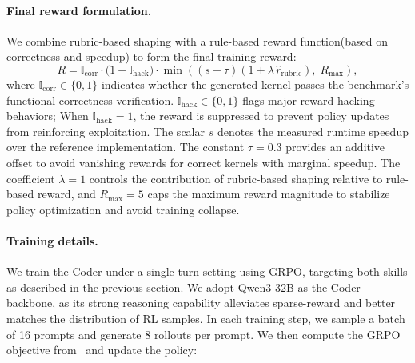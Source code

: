 \paragraph{Final reward formulation.}
We combine rubric-based shaping with a rule-based reward function(based on correctness and speedup) to form the final training reward:
{\footnotesize
\begin{equation}
R
=
\mathbb{I}_{\mathrm{corr}}
\cdot
\bigl(1-\mathbb{I}_{\mathrm{hack}}\bigr)
\cdot
\min\!\left(
\left(s + \tau \right)
\left( 1 + \lambda\,\hat{r}_{\mathrm{rubric}} \right),
\; R_{\max}
\right),
\label{eq:final_reward}
\end{equation}
}
where $\mathbb{I}_{\mathrm{corr}} \in \{0,1\}$ indicates whether the generated
kernel passes the benchmark’s functional correctness verification.
$\mathbb{I}_{\mathrm{hack}} \in \{0,1\}$ flags major reward-hacking behaviors;
When $\mathbb{I}_{\mathrm{hack}}=1$, the reward is suppressed to prevent policy
updates from reinforcing exploitation. The scalar $s$ denotes the measured
runtime speedup over the reference implementation. The constant $\tau=0.3$
provides an additive offset to avoid vanishing rewards for correct kernels with
marginal speedup. The coefficient $\lambda=1$ controls the contribution of
rubric-based shaping relative to rule-based reward, and $R_{\max}=5$
caps the maximum reward magnitude to stabilize policy optimization and avoid training collapse.

\paragraph{Training details.}
We train the Coder under a single-turn setting using GRPO, targeting both
skills as described in the previous section. We adopt Qwen3-32B as the Coder backbone, as its strong reasoning capability alleviates sparse-reward and better matches the distribution of RL samples. In each training step, we sample a batch of 16 prompts and generate $8$ rollouts per prompt. We then compute the GRPO objective from~\cite{Guo_2025} and update the policy:

